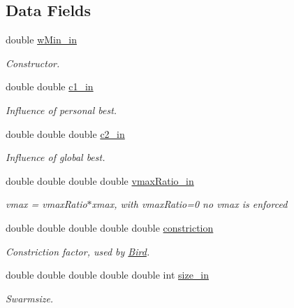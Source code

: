 \subsection*{Data Fields}
\begin{CompactItemize}
\item 
double \hyperlink{classPSO_630f0b982a4dbf3c8c50baad37eb8400}{wMin\_\-in}
\begin{CompactList}\small\item\em Constructor. \item\end{CompactList}\item 
double double \hyperlink{classPSO_c6d05fd6f3829bf14bdce996450fa588}{c1\_\-in}
\begin{CompactList}\small\item\em Influence of personal best. \item\end{CompactList}\item 
double double double \hyperlink{classPSO_f98d12b44572b19bce362214e62fe02e}{c2\_\-in}
\begin{CompactList}\small\item\em Influence of global best. \item\end{CompactList}\item 
double double double double \hyperlink{classPSO_2f47fe19b9f6c0640ea4810a0e60bc34}{vmaxRatio\_\-in}
\begin{CompactList}\small\item\em vmax = vmaxRatio$\ast$xmax, with vmaxRatio=0 no vmax is enforced \item\end{CompactList}\item 
double double double double double \hyperlink{classPSO_96a4c6267239fd7132f9528cb3ba883b}{constriction}
\begin{CompactList}\small\item\em Constriction factor, used by \hyperlink{classBird}{Bird}. \item\end{CompactList}\item 
double double double double double int \hyperlink{classPSO_27e09b7ad510b428a4d8017e3cbec742}{size\_\-in}
\begin{CompactList}\small\item\em Swarmsize. \item\end{CompactList}\item 

\end{CompactItemize}
